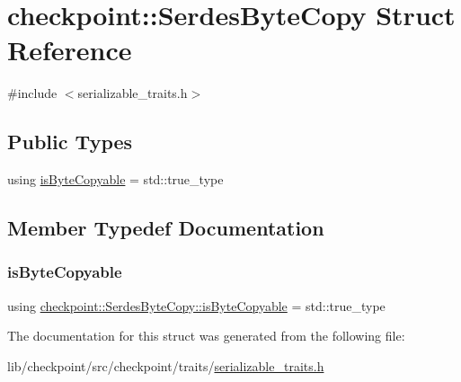 \hypertarget{structcheckpoint_1_1_serdes_byte_copy}{}\section{checkpoint\+:\+:Serdes\+Byte\+Copy Struct Reference}
\label{structcheckpoint_1_1_serdes_byte_copy}


{\ttfamily \#include $<$serializable\+\_\+traits.\+h$>$}

\subsection*{Public Types}
\begin{DoxyCompactItemize}
\item 
using \hyperlink{structcheckpoint_1_1_serdes_byte_copy_a494b6a70c19eca31240e58cffe8170f1}{is\+Byte\+Copyable} = std\+::true\+\_\+type
\end{DoxyCompactItemize}


\subsection{Member Typedef Documentation}
\mbox{\label{structcheckpoint_1_1_serdes_byte_copy_a494b6a70c19eca31240e58cffe8170f1}} 
\subsubsection{\texorpdfstring{is\+Byte\+Copyable}{isByteCopyable}}
{\footnotesize\ttfamily using \hyperlink{structcheckpoint_1_1_serdes_byte_copy_a494b6a70c19eca31240e58cffe8170f1}{checkpoint\+::\+Serdes\+Byte\+Copy\+::is\+Byte\+Copyable} =  std\+::true\+\_\+type}



The documentation for this struct was generated from the following file\+:\begin{DoxyCompactItemize}
\item 
lib/checkpoint/src/checkpoint/traits/\hyperlink{serializable__traits_8h}{serializable\+\_\+traits.\+h}\end{DoxyCompactItemize}

